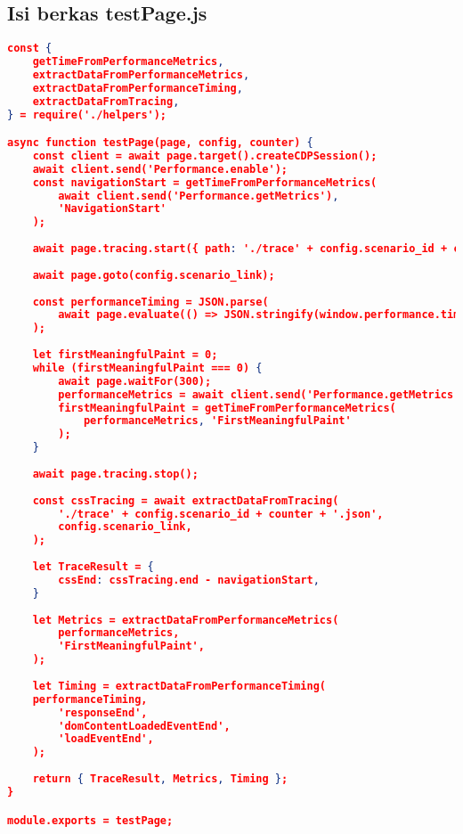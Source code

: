 	\subsection*{Isi berkas testPage.js}
\begin{lstlisting}[frame=single,tabsize=2,breaklines,caption={Isi berkas testPage.js},label=testjs, captionpos=b, language=json]
const {
	getTimeFromPerformanceMetrics,
	extractDataFromPerformanceMetrics,
	extractDataFromPerformanceTiming,
	extractDataFromTracing,
} = require('./helpers');

async function testPage(page, config, counter) {
	const client = await page.target().createCDPSession();
	await client.send('Performance.enable');
	const navigationStart = getTimeFromPerformanceMetrics(
		await client.send('Performance.getMetrics'),
		'NavigationStart'
	);
	
	await page.tracing.start({ path: './trace' + config.scenario_id + counter + '.json' });
	
	await page.goto(config.scenario_link);
	
	const performanceTiming = JSON.parse(
		await page.evaluate(() => JSON.stringify(window.performance.timing))
	);
	
	let firstMeaningfulPaint = 0;
	while (firstMeaningfulPaint === 0) {
		await page.waitFor(300);
		performanceMetrics = await client.send('Performance.getMetrics');
		firstMeaningfulPaint = getTimeFromPerformanceMetrics(
			performanceMetrics, 'FirstMeaningfulPaint'
		);
	}
	
	await page.tracing.stop();
	
	const cssTracing = await extractDataFromTracing(
		'./trace' + config.scenario_id + counter + '.json',
		config.scenario_link,
	);
	
	let TraceResult = {
		cssEnd: cssTracing.end - navigationStart,
	}
	
	let Metrics = extractDataFromPerformanceMetrics(
		performanceMetrics,
		'FirstMeaningfulPaint',
	);
	
	let Timing = extractDataFromPerformanceTiming(
	performanceTiming,
		'responseEnd',
		'domContentLoadedEventEnd',
		'loadEventEnd',
	);
	
	return { TraceResult, Metrics, Timing };
}

module.exports = testPage;
\end{lstlisting}

